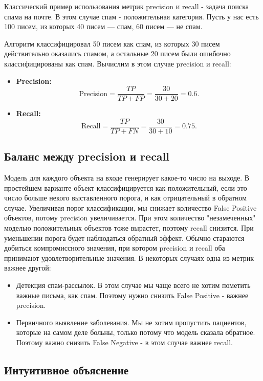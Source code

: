 Классический пример использования метрик precision и recall - задача поиска спама на почте. В этом случае спам - положительная категория. Пусть у нас есть 100 писем, из которых 40 писем — спам, 60 писем — не спам.

Алгоритм классифицировал 50 писем как спам, из которых 30 писем действительно оказались спамом, а остальные 20 писем были ошибочно классифицированы как спам. Вычислим в этом случае precision и recall:

\begin{itemize}
    \item \textbf{Precision:}
    \[
    \text{Precision} = \frac{TP}{TP + FP} = \frac{30}{30 + 20} = 0.6.
    \]

    \item \textbf{Recall:}
    \[
    \text{Recall} = \frac{TP}{TP + FN} = \frac{30}{30 + 10} = 0.75.
    \]
\end{itemize}

\subsection*{Баланс между precision и recall}

Модель для каждого объекта на входе генерирует какое-то число на выходе. В простейшем варианте объект классифицируется как положительный, если это число больше некого выставленного порога, и как отрицательный в обратном случае. Увеличивая порог классификации, мы снижает количество False Positive объектов, потому precision увеличивается. При этом количество "незамеченных" моделью положительных объектов тоже вырастет, поэтому recall снизится. При уменьшении порога будет наблюдаться обратный эффект. Обычно стараются добиться компромиссного значения, при котором precision и recall оба принимают удовлетворительные значения. В некоторых случаях одна из метрик важнее другой:

\begin{itemize}
    \item Детекция спам-рассылок. В этом случае мы чаще всего не хотим пометить важные письма, как спам. Поэтому нужно снизить False Positive - важнее precision.
    \item Первичного выявление заболевания. Мы не хотим пропустить пациентов, которые на самом деле больны, только потому что модель сказала обратное. Поэтому важно снизить False Negative - в этом случае важнее recall. 
\end{itemize}

\subsection*{Интуитивное объяснение}

